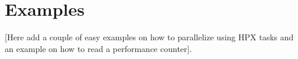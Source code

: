 
\section{Examples} \label{sec:examples}


[\TODO Here add a couple of easy examples on how to parallelize using HPX tasks and an example on how to read a performance counter].

